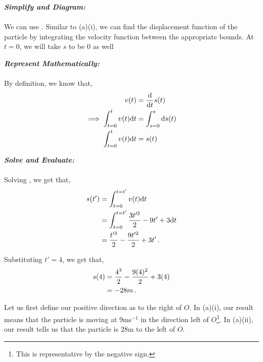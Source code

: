 \begin{subquestions}
\begin{subsubquestions}

\subsubquestion

\textbf{\textit{Simplify and Diagram:}} \\ \\
We can use . Similar to (a)(i), we can find the displacement function of the particle by integrating the velocity function between the appropriate bounds. At $t=0$, we will take $s$ to be $0$ as well




\textbf{\textit{Represent Mathematically:}} \\ \\
By definition, we know that,
\begin{align}
	v(t) & = \frac{\mathrm{d}}{\mathrm{d}t}s(t) \nonumber \\
	\implies \int_{t=0}^{t}v(t)\mathrm{d} t & = \int_{s=0}^{s} \mathrm{d} s(t) \nonumber \\
	\int_{t=0}^{t}v(t)\mathrm{d} t & = s(t)  \label{2009:q6:SEqn1}
\end{align}




\textbf{\textit{Solve and Evaluate:}} \\ \\
Solving , we get that,
\begin{align}
	s(t') & = \int_{t=0}^{t=t'} v(t)\mathrm{d} t \nonumber \\
	      & = \int_{t=0}^{t=t'} \frac{3t'^2}{2}-9t' +3 \mathrm{d} t \nonumber \\
	      & = \frac{t'^3}{2} - \frac{9t'^2}{2} + 3t' \,.
\end{align}

Substituting $t'=4$, we get that,
\begin{align}
	s(4) & = \frac{4^3}{2} - \frac{9(4)^2}{2} + 3(4) \nonumber \\
	     & = -28m\,.
\end{align}
	
\end{subsubquestions}


\subquestion

Let us first define our positive direction as to the right of $O$. In (a)(i), our result means that the particle is moving at 9ms$^{-1}$ in the direction left of $O$\footnote{This is representative by the negative sign.}. In (a)(ii), our result tells us that the particle is 28m to the left of $O$.


\end{subquestions}
